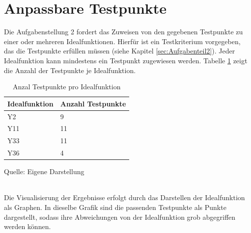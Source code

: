 \documentclass[
    a4paper, 								%
    oneside, 								%
    11pt, 									%
    listof=totoc, 					%
    bibliography=totoc, 		%
    final, 									%
    numbers=noenddot
]{scrreprt}
\begin{document}
\section{Anpassbare Testpunkte}
Die Aufgabenstellung 2 fordert das Zuweisen von den gegebenen Testpunkte zu einer oder mehreren Idealfunktionen. Hierfür ist ein Testkriterium vorgegeben, das die Testpunkte erfüllen müssen (siehe Kapitel \ref{sec:Aufgabenteil2}). Jeder Idealfunktion kann mindestens ein Testpunkt zugewiesen werden. Tabelle \ref{tab:Testpunkte} zeigt die Anzahl der Testpunkte je Idealfunktion. 
\begin{table}[!h]
\centering
\caption{Anzal Testpunkte pro Idealfunktion}
\vspace{6pt}
\begin{tabularx}{0.5\textwidth}{|l|X|}
\hline
\textbf{Idealfunktion} & \textbf{Anzahl Testpunkte}\\
\hline
Y2 & 9\\
\hline
Y11 & 11\\
\hline
Y33 & 11\\
\hline
Y36 & 4\\
\hline
\end{tabularx}
\vspace{6pt}

Quelle: Eigene Darstellung
\label{tab:Testpunkte}
\end{table}
\\Die Visualisierung der Ergebnisse erfolgt durch das Darstellen der Idealfunktion als Graphen. In dieselbe Grafik sind die passenden Testpunkte als Punkte dargestellt, sodass ihre Abweichungen von der Idealfunktion grob abgegriffen werden können.
\end{document}
